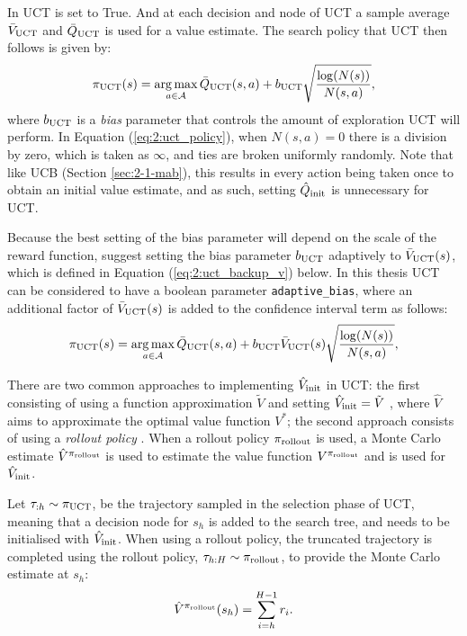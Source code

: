         In UCT \mctsmode\ewe is set to True. And at each decision and node of UCT a sample average ${\bar{V}_{{\textnormal{UCT}}}}$ and ${\bar{Q}_{{\textnormal{UCT}}}}$ is used for a value estimate. The search policy that UCT then follows is given by:
        \begin{align}
            {\pi_{{\textnormal{UCT}}}}(s) = \operatorname*{arg\,max}_{a\in\mathcal{A}} {\bar{Q}_{{\textnormal{UCT}}}}(s,a) + {b_{{\textnormal{UCT}}}} \sqrt{\frac{\log(N(s))}{N(s,a)}}, \label{eq:2:uct_policy}
        \end{align}
        where ${b_{{\textnormal{UCT}}}}$ is a \textit{bias} parameter that controls the amount of exploration UCT will perform. In Equation (\ref{eq:2:uct_policy}), when $N(s,a)=0$ there is a division by zero, which is taken as $\infty$, and ties are broken uniformly randomly. Note that like UCB (Section \ref{sec:2-1-mab}), this results in every action being taken once to obtain an initial value estimate, and as such, setting ${\hat{Q}_{\textnormal{init}}}$ is unnecessary for UCT.   

        Because the best setting of the bias parameter will depend on the scale of the reward function, \citet{thts} suggest setting the bias parameter ${b_{{\textnormal{UCT}}}}$ adaptively to ${\bar{V}_{{\textnormal{UCT}}}}(s)$, which is defined in Equation (\ref{eq:2:uct_backup_v}) below. In this thesis UCT can be considered to have a boolean parameter \texttt{adaptive\_bias}, where an additional factor of ${\bar{V}_{{\textnormal{UCT}}}}(s)$ is added to the confidence interval term as follows:
        \begin{align}
            {\pi_{{\textnormal{UCT}}}}(s) = \operatorname*{arg\,max}_{a\in\mathcal{A}} {\bar{Q}_{{\textnormal{UCT}}}}(s,a) + {b_{{\textnormal{UCT}}}} {\bar{V}_{{\textnormal{UCT}}}}(s) \sqrt{\frac{\log(N(s))}{N(s,a)}}, \label{eq:2:adaptive_uct_policy}
        \end{align}
        
        There are two common approaches to implementing ${\hat{V}_{\textnormal{init}}}$ in UCT: the first consisting of using a function approximation $\tilde{V}$ and setting ${\hat{V}_{\textnormal{init}}}=\tilde{V}$ \cite{alpha_go_zero,alpha_zero,a0c} , where $\hat{V}$ aims to approximate the optimal value function $V^*$; the second approach consists of using a \textit{rollout policy} \cite{mcts_survey,rave,prost,bus}. When a rollout policy ${\pi_{{\textnormal{rollout}}}}$ is used, a Monte Carlo estimate $\hat{V}^{{\pi_{{\textnormal{rollout}}}}}$ is used to estimate the value function $V^{{\pi_{{\textnormal{rollout}}}}}$ and is used for ${\hat{V}_{\textnormal{init}}}$.

        Let $\tau_{:h}\sim{\pi_{{\textnormal{UCT}}}}$, be the trajectory sampled in the selection phase of UCT, meaning that a decision node for $s_h$ is added to the search tree, and needs to be initialised with ${\hat{V}_{\textnormal{init}}}$. When using a rollout policy, the truncated trajectory is completed using the rollout policy, $\tau_{h:H}\sim{\pi_{{\textnormal{rollout}}}}$, to provide the Monte Carlo estimate at $s_h$:
        \begin{align}
            \hat{V}^{{\pi_{{\textnormal{rollout}}}}}(s_h) = \sum_{i=h}^{H-1} r_i. \label{eq:2:rollout_value_estimate}
        \end{align}

